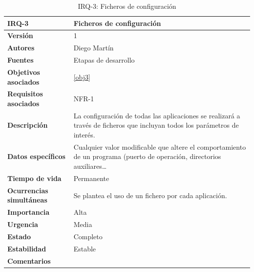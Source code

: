 \begin{table}[H]
\centering
\begin{tabular}{|p{3.5cm}|p{10cm}|}
\hline
\textbf{IRQ-3} &Ficheros de configuración\\
\hline
\textbf{Versión} & 1\\
\hline
\textbf{Autores} &Diego Martín\\
\hline
\textbf{Fuentes} & Etapas de desarrollo\\
\hline
\textbf{Objetivos asociados} & \ref{obj3}\\
\hline
\textbf{Requisitos asociados} & NFR-1\\
\hline
\textbf{Descripción} &La configuración de todas las aplicaciones se realizará a través de ficheros que incluyan todos los parámetros de interés. \\
\hline
\textbf{Datos específicos} &Cualquier valor modificable que altere el comportamiento de un programa (puerto de operación, directorios auxiliares\dots\\
\hline
\textbf{Tiempo de vida} &Permanente\\
\hline
\textbf{Ocurrencias simultáneas} &Se plantea el uso de un fichero por cada aplicación.\\
\hline
\textbf{Importancia} &Alta\\
\hline
\textbf{Urgencia} &Media\\
\hline
\textbf{Estado} &Completo\\
\hline
\textbf{Estabilidad} &Estable\\
\hline
\textbf{Comentarios} &\\
\hline
\end{tabular}
\caption{IRQ-3: Ficheros de configuración}
\end{table}

